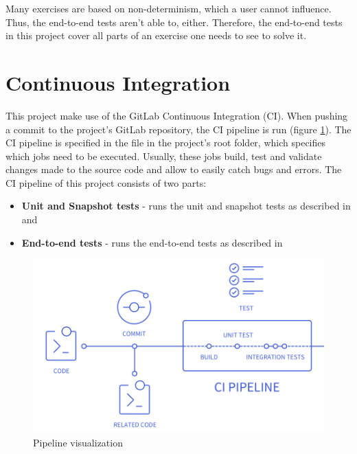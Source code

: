 Many exercises are based on non-determinism, which a user cannot influence. Thus, the end-to-end tests aren't able to, either. Therefore, the end-to-end tests in this project cover all parts of an exercise one needs to see to solve it. 

\section{Continuous Integration}
\label{section:CI}

This project make use of the GitLab Continuous Integration (CI). When pushing a commit to the project's GitLab repository, the CI pipeline is run (figure \ref{fig:pipeline}). The CI pipeline is specified in the  file in the project's root folder, which specifies which jobs need to be executed. Usually, these jobs build, test and validate changes made to the source code and allow to easily catch bugs and errors.
The CI pipeline of this project consists of two parts:

\begin{itemize}
    \item \textbf{Unit and Snapshot tests} - runs the unit and snapshot tests as described in  and 
    \item \textbf{End-to-end tests} - runs the end-to-end tests as described in 
\end{itemize}

\begin{figure} 
    \centering
    \includegraphics[width=0.6 \columnwidth]{figures/pipeline.png}
    \caption{Pipeline visualization \cite{CIPipeline}} 
    \label{fig:pipeline} 
\end{figure}